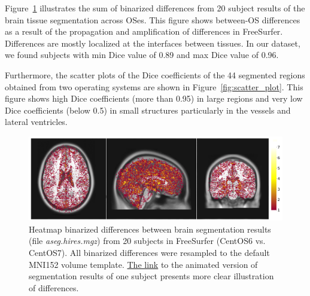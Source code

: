 \documentclass[a4paper,num-refs]{oup-contemporary}
\begin{document}
Figure~\ref{fig:tissue_class} illustrates the sum of binarized differences 
from 20 subject results of the brain tissue segmentation across OSes.
This figure shows between-OS differences  
as a result of the propagation and amplification of differences in FreeSurfer. 
Differences are mostly localized at the interfaces between tissues.
In our dataset, we found subjects with min Dice value of 0.89 and max Dice  
value of 0.96.

Furthermore, the scatter plots of the Dice coefficients of the 44 segmented regions obtained 
from two operating systems are shown in Figure~\ref{fig:scatter_plot}.
This figure shows high Dice coefficients (more than 0.95) in large regions and very low 
Dice coefficients (below 0.5) in small structures particularly in the vessels and lateral ventricles.


\begin{figure}
\centering
  \includegraphics[width=\columnwidth]{images/brain_segmentation_mni.png} 
  \caption{Heatmap binarized differences between brain segmentation results (file \emph{aseg.hires.mgz}) from 
          20 subjects in FreeSurfer (CentOS6 vs. CentOS7). 
          All binarized differences were resampled to the default MNI152 volume template.
          \href{https://github.com/ali4006/HCP-reproducibility-paper/blob/master/images/fs_brain_segmentation.gif}
          {The link} to the animated version of segmentation results of one subject presents more clear illustration of differences.} 
  \label{fig:tissue_class}
\end{figure}
\end{document}
